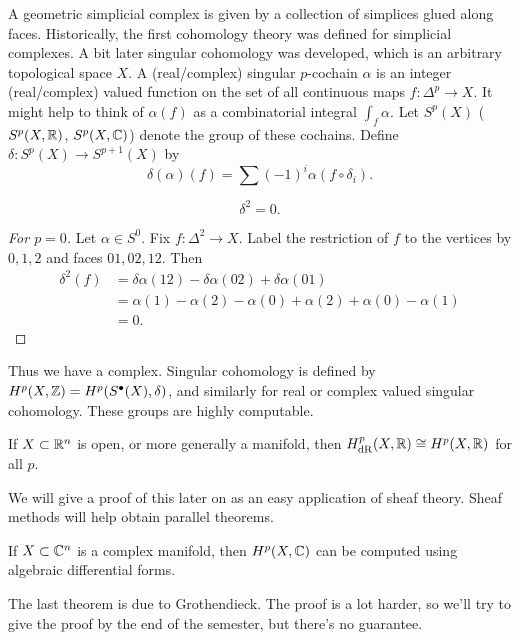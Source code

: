 A geometric simplicial complex is given by a collection of simplices glued
along faces. Historically, the first cohomology theory was defined for
simplicial complexes. A bit later singular cohomology was developed, which
is an arbitrary topological space \(X\). A (real/complex) singular
\(p\)-cochain \(\alpha\) is an integer (real/complex) valued function on
the set of all continuous maps \(f\colon\Delta^p\to X\). It might help to
think of \(\alpha(f)\) as a combinatorial integral \(\int_f\alpha\). Let
\(S^p(X)\) (\(S^p(X,\mathbb{R})\), \(S^p(X,\mathbb{C})\)) denote the group of these
cochains. Define \(\delta\colon S^p(X)\to S^{p+1}(X)\) by
\[
  \delta(\alpha)(f)=\sum(-1)^i\alpha(f\circ\delta_i).
\]

\begin{lemma}
  \[\delta^2=0.\]
\end{lemma}
\begin{proof}[For \(p=0\)]
  Let \(\alpha\in S^0\). Fix \(f\colon\Delta^2\to X\). Label the
  restriction of \(f\) to the vertices by \(0,1,2\) and faces
  \(01,02,12\). Then
  \begin{align*}
    \delta^2(f)&=\delta\alpha(12)-\delta\alpha(02)+\delta\alpha(01)\\
               &=\alpha(1)-\alpha(2)-\alpha(0)+\alpha(2)+\alpha(0)-\alpha(1)\\
               &=0.
  \end{align*}
\end{proof}

Thus we have a complex. Singular cohomology is defined by
\(H^p(X,\mathbb{Z})=H^p(S^\bullet(X),\delta)\), and similarly for real or complex
valued singular cohomology. These groups are highly computable.

\begin{theorem}[de Rham]
  If \(X\subset\mathbb{R}^n\) is open, or more generally a manifold, then
  \(H^p_{\mathrm{dR}}(X,\mathbb{R})\cong H^p(X,\mathbb{R})\) for all \(p\).
\end{theorem}

We will give a proof of this later on as an easy application of sheaf
theory. Sheaf methods will help obtain parallel theorems.

\begin{theorem}
  If \(X\subset\mathbb{C}^n\) is a complex manifold, then \(H^p(X,\mathbb{C})\) can be
  computed using algebraic differential forms.
\end{theorem}

The last theorem is due to Grothendieck. The proof is a lot harder, so
we'll try to give the proof by the end of the semester, but there's no
guarantee.


